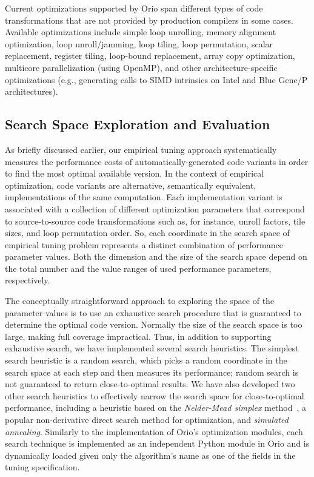 Current optimizations supported by Orio span different types of code
transformations that are not provided by production compilers in some
cases. Available optimizations include simple loop unrolling, memory
alignment optimization, loop unroll/jamming, loop tiling, loop permutation,
scalar replacement, register tiling, loop-bound replacement, array copy
optimization, multicore parallelization (using OpenMP), and other
architecture-specific optimizations (e.g., generating calls to SIMD
intrinsics on Intel and Blue Gene/P architectures).

\subsection{Search Space Exploration and Evaluation}
\label{sec:search-space}

As briefly discussed earlier, our empirical tuning approach systematically
measures the performance costs of automatically-generated code variants in
order to find the most optimal available version. In the context of empirical
optimization, code variants are alternative, semantically equivalent,
implementations of the same computation. Each implementation variant is
associated with a collection of different optimization parameters that
correspond to source-to-source code transformations such as, for instance,
unroll factors, tile sizes, and loop permutation order. So, each coordinate
in the search space of empirical tuning problem represents a distinct
combination of performance parameter values. Both the dimension and the size
of the search space depend on the total number and the value ranges of used
performance parameters, respectively.

The conceptually straightforward approach to exploring the space of the
parameter values is to use an exhaustive search procedure that is guaranteed
to determine the optimal code version. Normally the size of the search space
is too large, making full coverage impractical.  Thus, in addition to
supporting exhaustive search, we have implemented several search heuristics.
The simplest search heuristic is a random search, which picks a random
coordinate in the search space at each step and then measures its
performance; random search is not guaranteed to return close-to-optimal results.
We have also developed two other search heuristics to effectively
narrow the search space for close-to-optimal performance, including a
heuristic based on the \textit{Nelder-Mead simplex}
method~\cite{Lagarias98simplex,Lewis00directsearch}, 
a popular non-derivative direct search method for optimization, and \textit{simulated
annealing}\cite{Kirkpatrick83optimizationby}.
Similarly to the implementation of Orio's optimization modules, each search
technique is implemented as an independent Python module in Orio and is dynamically
loaded given only the algorithm's name as one of the fields in the tuning
specification.

